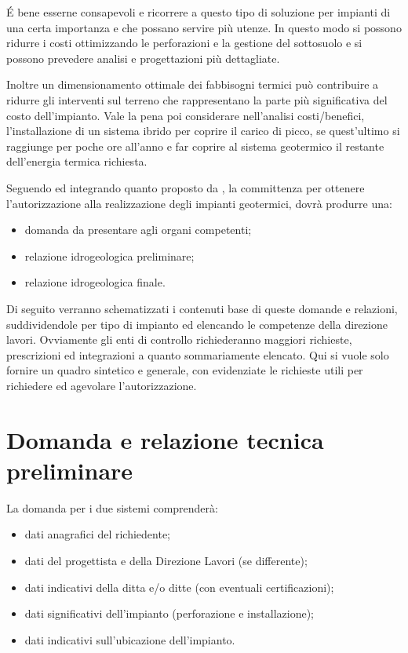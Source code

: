 \'E bene esserne consapevoli e ricorrere a questo tipo di soluzione per impianti di una certa importanza e che possano servire più utenze. In questo modo si possono ridurre i costi ottimizzando le perforazioni e la gestione del sottosuolo e si possono prevedere analisi e progettazioni più dettagliate.

Inoltre un dimensionamento ottimale dei fabbisogni termici può contribuire a ridurre gli interventi sul terreno che rappresentano la parte più significativa del costo dell'impianto. Vale la pena poi considerare nell'analisi costi/benefici, l'installazione di un sistema ibrido per coprire il carico di picco, se quest'ultimo si raggiunge per poche ore all'anno e far coprire al sistema geotermico il restante  dell'energia termica richiesta.

Seguendo ed integrando quanto proposto da \cite{anipa}, la committenza per ottenere l'autorizzazione alla realizzazione degli impianti geotermici, dovrà produrre una:
\begin{itemize}
\item domanda da presentare agli organi competenti;
\item relazione idrogeologica preliminare;
\item relazione idrogeologica finale.
\end{itemize}

Di seguito verranno schematizzati i contenuti base di queste domande e relazioni, suddividendole per tipo di impianto ed elencando le competenze della direzione lavori. Ovviamente gli enti di controllo richiederanno maggiori richieste, prescrizioni ed integrazioni a quanto sommariamente elencato. Qui si vuole solo fornire un quadro sintetico e generale, con evidenziate le richieste utili per richiedere ed agevolare l'autorizzazione.

\newpage
\section{Domanda e relazione tecnica preliminare}
La domanda per i due sistemi comprenderà:
\begin{itemize}
\item dati anagrafici del richiedente;
\item dati del progettista e della Direzione Lavori (se differente);
\item dati indicativi della ditta e/o ditte (con eventuali certificazioni);
\item dati significativi dell'impianto (perforazione e installazione);
\item dati indicativi sull'ubicazione dell'impianto.
\end{itemize}


